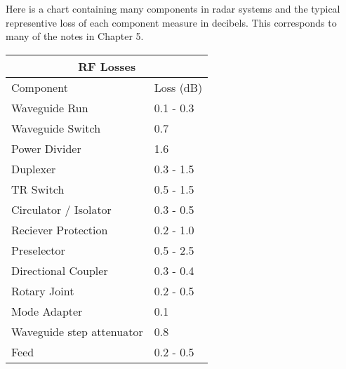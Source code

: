 \documentclass[12pt]{article}
\begin{document}
Here is a chart containing many components in radar systems and the typical representive loss of each component measure in decibels. This corresponds to many of the notes in Chapter 5. 
\begin{center}
    \begin{tabular}{ |p{5cm}|p{5cm}|}
        \hline
            \multicolumn{2}{|c|}{RF Losses} \\
        \hline
            Component & Loss (dB) \\
        \hline
            Waveguide Run & 0.1 - 0.3 \\
            Waveguide Switch & 0.7 \\
            Power Divider & 1.6 \\
            Duplexer & 0.3 - 1.5 \\
            TR Switch & 0.5 - 1.5 \\
            Circulator / Isolator & 0.3 - 0.5 \\
            Reciever Protection & 0.2 - 1.0 \\
            Preselector & 0.5 - 2.5 \\
            Directional Coupler & 0.3 - 0.4 \\
            Rotary Joint & 0.2 - 0.5 \\
            Mode Adapter & 0.1 \\
            Waveguide step attenuator & 0.8 \\
            Feed & 0.2 - 0.5 \\
        \hline
    \end{tabular}
\end{center}
\end{document}
